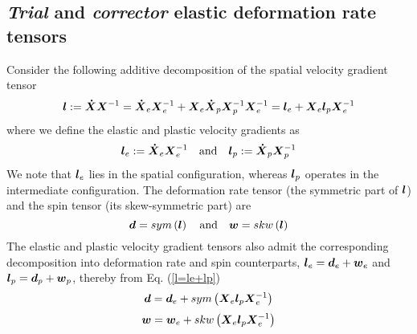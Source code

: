 \documentclass[preprint,review,12pt,sort&compress]{elsarticle}%
\renewcommand{\mathbf}[1]{\mbox{\boldmath $#1$ \unboldmath}  \!\!}
\begin{document}
\subsection{\emph{Trial} and \emph{corrector} elastic deformation rate
tensors}

Consider the following additive decomposition of the spatial velocity gradient
tensor%
\begin{equation}
\mathbf{l}:=\mathbf{\dot{X}X}^{-1}=\mathbf{\dot{X}}_{e}\mathbf{X}_{e}%
^{-1}+\mathbf{X}_{e}\mathbf{\dot{X}}_{p}\mathbf{X}_{p}^{-1}\mathbf{X}_{e}%
^{-1}=\mathbf{l}_{e}+\mathbf{X}_{e}\mathbf{l}_{p}\mathbf{X}_{e}^{-1}
\label{l=le+lp}%
\end{equation}
where we define the elastic and plastic velocity gradients as%
\begin{equation}
\mathbf{l}_{e}:=\mathbf{\dot{X}}_{e}\mathbf{X}_{e}^{-1}\text{\quad and\quad
}\mathbf{l}_{p}:=\mathbf{\dot{X}}_{p}\mathbf{X}_{p}^{-1}%
\end{equation}
We note that $\mathbf{l}_{e}$ lies in the spatial configuration, whereas
$\mathbf{l}_{p}$ operates in the intermediate configuration. The deformation
rate tensor (the symmetric part of $\mathbf{l}$) and the spin tensor (its
skew-symmetric part) are%
\begin{equation}
\mathbf{d}=sym\left(  \mathbf{l}\right)  \text{\quad and\quad}\mathbf{w}%
=skw\left(  \mathbf{l}\right)
\end{equation}
The elastic and plastic velocity gradient tensors also admit the corresponding
decomposition into deformation rate and spin counterparts, $\mathbf{l}%
_{e}=\mathbf{d}_{e}+\mathbf{w}_{e}$ and $\mathbf{l}_{p}=\mathbf{d}%
_{p}+\mathbf{w}_{p}$, thereby from Eq. (\ref{l=le+lp})%
\begin{equation}
\mathbf{d}=\mathbf{d}_{e}+sym\left(  \mathbf{X}_{e}\mathbf{l}_{p}%
\mathbf{X}_{e}^{-1}\right)  \label{d=de+lp}%
\end{equation}%
\begin{equation}
\mathbf{w}=\mathbf{w}_{e}+skw\left(  \mathbf{X}_{e}\mathbf{l}_{p}%
\mathbf{X}_{e}^{-1}\right)
\end{equation}
\end{document}
